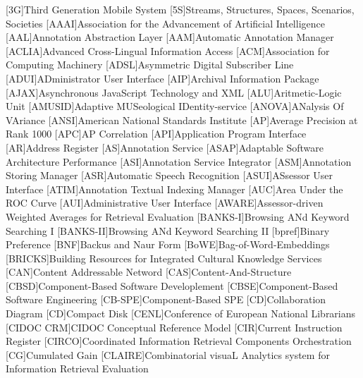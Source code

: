[3G]{Third Generation Mobile System}
[5S]{Streams, Structures, Spaces, Scenarios, Societies}
[AAAI]{Association for the Advancement of Artificial Intelligence}
[AAL]{Annotation Abstraction Layer}
[AAM]{Automatic Annotation Manager}
[ACLIA]{Advanced Cross-Lingual Information Access}
[ACM]{Association for Computing Machinery}
[ADSL]{Asymmetric Digital Subscriber Line}
[ADUI]{ADministrator User Interface}
[AIP]{Archival Information Package}
[AJAX]{Asynchronous JavaScript Technology and \acs{XML}}
[ALU]{Aritmetic-Logic Unit}
[AMUSID]{Adaptive MUSeological IDentity-service}
[ANOVA]{ANalysis Of VAriance}
[ANSI]{American National Standards Institute}
[AP]{Average Precision at Rank 1000}
[APC]{AP Correlation}
[API]{Application Program Interface}
[AR]{Address Register}
[AS]{Annotation Service}
[ASAP]{Adaptable Software Architecture Performance}
[ASI]{Annotation Service Integrator}
[ASM]{Annotation Storing Manager}
[ASR]{Automatic Speech Recognition}
[ASUI]{ASsessor User Interface}
[ATIM]{Annotation Textual Indexing Manager}
[AUC]{Area Under the ROC Curve}
[AUI]{Administrative User Interface}
[AWARE]{Assessor-driven Weighted Averages for Retrieval Evaluation}
[BANKS-I]{Browsing ANd Keyword Searching I}
[BANKS-II]{Browsing ANd Keyword Searching II}
[bpref]{Binary Preference}
[BNF]{Backus and Naur Form}
[BoWE]{Bag-of-Word-Embeddings}
[BRICKS]{Building Resources for Integrated Cultural Knowledge Services}
[CAN]{Content Addressable Netword}
[CAS]{Content-And-Structure}
[CBSD]{Component-Based Software Developlement}
[CBSE]{Component-Based Software Engineering}
[CB-SPE]{Component-Based \acs{SPE}}
[CD]{Collaboration Diagram}
[CD]{Compact Disk}
[CENL]{Conference of European National Librarians}
[CIDOC CRM]{CIDOC Conceptual Reference Model}
[CIR]{Current Instruction Register}
[CIRCO]{Coordinated Information Retrieval Components Orchestration}
[CG]{Cumulated Gain}
[CLAIRE]{Combinatorial visuaL Analytics system for Information Retrieval Evaluation}
